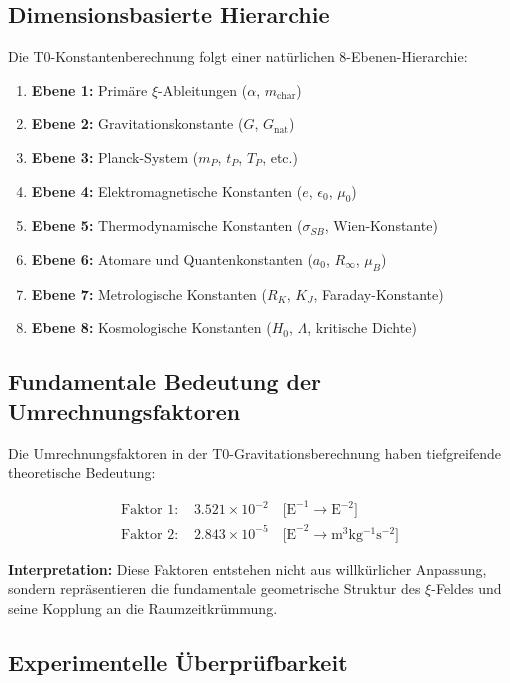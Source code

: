 	\subsection{Dimensionsbasierte Hierarchie}
	
	Die T0-Konstantenberechnung folgt einer natürlichen 8-Ebenen-Hierarchie:
	
	\begin{enumerate}
		\item \textbf{Ebene 1:} Primäre $\xi$-Ableitungen ($\alpha$, $m_{\text{char}}$)
		\item \textbf{Ebene 2:} Gravitationskonstante ($G$, $G_{\text{nat}}$)
		\item \textbf{Ebene 3:} Planck-System ($m_P$, $t_P$, $T_P$, etc.)
		\item \textbf{Ebene 4:} Elektromagnetische Konstanten ($e$, $\epsilon_0$, $\mu_0$)
		\item \textbf{Ebene 5:} Thermodynamische Konstanten ($\sigma_{SB}$, Wien-Konstante)
		\item \textbf{Ebene 6:} Atomare und Quantenkonstanten ($a_0$, $R_\infty$, $\mu_B$)
		\item \textbf{Ebene 7:} Metrologische Konstanten ($R_K$, $K_J$, Faraday-Konstante)
		\item \textbf{Ebene 8:} Kosmologische Konstanten ($H_0$, $\Lambda$, kritische Dichte)
	\end{enumerate}
	
	\subsection{Fundamentale Bedeutung der Umrechnungsfaktoren}
	
	Die Umrechnungsfaktoren in der T0-Gravitationsberechnung haben tiefgreifende theoretische Bedeutung:
	
	\begin{align}
		\text{Faktor 1: } &3.521 \times 10^{-2} \quad \text{[E}^{-1} \rightarrow \text{E}^{-2}\text{]} \\
		\text{Faktor 2: } &2.843 \times 10^{-5} \quad \text{[E}^{-2} \rightarrow \si{\meter^3 \kilogram^{-1} \second^{-2}}\text{]}
	\end{align}
	
	\textbf{Interpretation:} Diese Faktoren entstehen nicht aus willkürlicher Anpassung, sondern repräsentieren die fundamentale geometrische Struktur des $\xi$-Feldes und seine Kopplung an die Raumzeitkrümmung.
	
	\subsection{Experimentelle Überprüfbarkeit}
	
